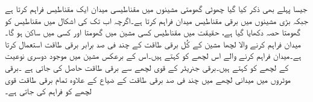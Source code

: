 جیسا پہلے بھی ذکر کیا گیا چھوٹی گھومتی مشینوں میں مقناطیسی میدان ایک مقناطیس  فراہم کرتا ہے جبکہ بڑی مشینوں میں برقی مقناطیس  میدان فراہم کرتا ہے۔اگرچہ اب تک کی اشکال میں مقناطیس کو گھومتا حصہ دکھایا گیا ہے، حقیقت میں مقناطیس  کسی مشین میں گھومتا اور کسی میں  ساکن ہو گا۔ میدان فراہم کرنے والا لچھا مشین کے کُل برقی طاقت کے چند فی صد برابر برقی طاقت استعمال کرتا ہے۔میدان فراہم کرنے والے اس لچھے کو   کہتے ہیں۔اس کے برعکس مشین میں موجود دوسری نوعیت کے لچھے کو   کہتے ہیں۔برقی جنریٹر کے قوی لچھے سے  برقی طاقت  حاصل کی جاتی ہے ۔برقی موٹروں میں میدانی لچھے میں چند فی صد برقی طاقت کے ضیاع کے علاوہ  تمام برقی طاقت  قوی لچھے کو فراہم کی جاتی ہے۔
\begin{figure}
\centering
\begin{minipage}{0.45\textwidth}
\centering
\end{minipage}
\end{figure}
